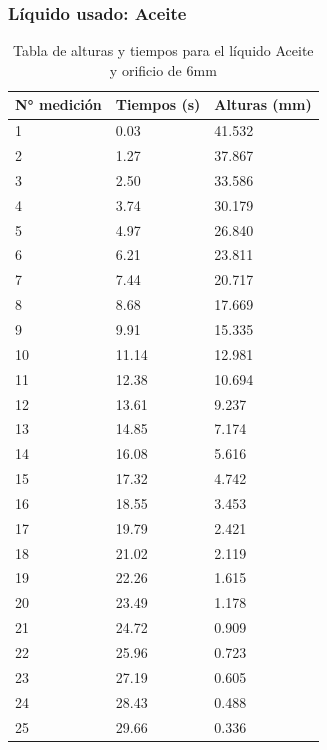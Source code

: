 \documentclass{article}
\begin{document}
\subsubsection{Líquido usado: Aceite}
\begin{table}[H]
    \begin{center}
        \begin{tabular}{ | m{2cm} | m{2cm} | m{2cm} | }
            \hline N° medición & Tiempos (s) & Alturas (mm) \\ 
            \hline 1 & 0.03 & 41.532 \\
            \hline 2 & 1.27 & 37.867 \\
            \hline 3 & 2.50 & 33.586 \\
            \hline 4 & 3.74 & 30.179 \\
            \hline 5 & 4.97 & 26.840 \\
            \hline 6 & 6.21 & 23.811 \\
            \hline 7 & 7.44 & 20.717 \\
            \hline 8 & 8.68 & 17.669 \\
            \hline 9 & 9.91 & 15.335 \\
            \hline 10 & 11.14 & 12.981 \\
            \hline 11 & 12.38 & 10.694 \\
            \hline 12 & 13.61 & 9.237 \\
            \hline 13 & 14.85 & 7.174 \\
            \hline 14 & 16.08 & 5.616 \\
            \hline 15 & 17.32 & 4.742 \\
            \hline 16 & 18.55 & 3.453 \\
            \hline 17 & 19.79 & 2.421 \\
            \hline 18 & 21.02 & 2.119 \\
            \hline 19 & 22.26 & 1.615 \\
            \hline 20 & 23.49 & 1.178 \\
            \hline 21 & 24.72 & 0.909 \\
            \hline 22 & 25.96 & 0.723 \\
            \hline 23 & 27.19 & 0.605 \\
            \hline 24 & 28.43 & 0.488 \\
            \hline 25 & 29.66 & 0.336 \\
            \hline
        \end{tabular}
    \end{center}
    \caption{Tabla de alturas y tiempos para el líquido Aceite y orificio de 6mm}
\end{table}
\end{document}

